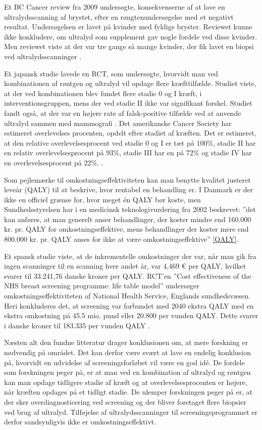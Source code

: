 Et BC Cancer review fra 2009 \cite{FyldigeBryster} undersøgte, konsekvenserne af at lave en ultralydsscanning af brystet, efter en røngtenundersøgelse med et negativt resultat. Undersøgelsen er lavet på kvinder med fyldige bryster. Reviewet kunne ikke konkludere, om ultralyd som supplement gav nogle fordele ved disse kvinder. Men reviewet viste at der var tre gange så mange kvinder, der fik lavet en biopsi ved ultralydsscanninger \cite{DenseBreast}. 

Et japansk studie lavede en RCT, som undersøgte, hvorvidt man ved kombinationen af røntgen og ultralyd vil opdage flere kræfttilfælde. Studiet viste, at der ved kombinationen blev fundet flere stadie 0 og I kræft, i interventionsgruppen, mens der ved stadie II ikke var signifikant forskel. Studiet fandt også, at der var en højere rate af falsk-positive tilfælde ved at anvende ultralyd sammen med mammografi \cite{Japan}.
Det amerikanske Cancer Society har estimeret overlevelses procenten, opdelt efter stadiet af kræften. Det er estimeret, at den relative overlevelsesprocent ved stadie 0 og I er tæt på 100\%, stadie II har en relativ overlevelsesprocent på 93\%, stadie III har en på 72\% og stadie IV har en overlevelsesprocent på 22\%. \cite{CancerSociety}. 

Som pejlemærke til omkostningseffektiviteten kan man benytte kvalitet justeret leveår (QALY) til at beskrive, hvor rentabel en behandling er. I Danmark er der ikke en officiel grænse for, hvor meget én QALY bør koste, men Sundhedsstyrelsen har i en medicinsk teknologivurdering fra 2002 beskrevet: ”det kan anføres, at man generelt anser behandlinger, der koster mindre end 160.000 kr. pr. QALY for omkostningseffektive, mens behandlinger der koster mere end 800.000 kr. pr. QALY anses for ikke at være omkostningseffektive” \ref{QALY}. 

Et spansk studie viste, at de inkrementelle omkostninger der var, når man gik fra ingen scanninger til en scanning hver andet år, var 4,469 € per QALY, hvilket svarer til 33.241,76 danske kroner per QALY. RCT'en ”Cost effectiveness of the NHS breast screening programme: life table model”  undersøger omkostningseffektiviteten af National Health Service, Englands sundhedsvæsen. Heri konkluderes det, at screening var forbundet med 2040 ekstra QALY med en ekstra omkostning på 45.5 mio. pund eller 20.800 per vunden QALY. Dette svarer i danske kroner til 183.335 per vunden QALY \cite{SpanskStudie}. 

Næsten alt den fundne litteratur drager konklusionen om, at mere forskning er nødvendig på området. Det kan derfor være svært at lave en endelig konklusion på, hvorvidt en udvidelse af screeningsforløbet vil være en god idé. 
De fordele som forskningen peger på, er at man ved en kombination af ultralyd og røntgen kan man opdage tidligere stadie af kræft og at overlevelsesprocenten er højere, når kræften opdages på et tidligt stadie. 
De ulemper forskningen peger på er, at der sker overdiagnosticering ved screening og der bliver foretaget flere biopsier ved brug af ultralyd. Tilføjelse af ultralydsscanninger til screeningsprogrammet er derfor sandsynligvis ikke er omkostningseffektivt. 